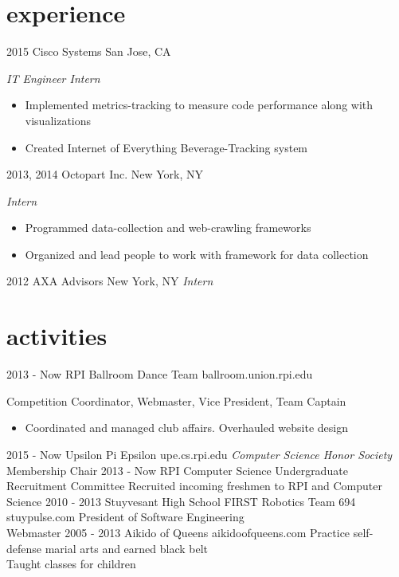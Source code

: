 \documentclass[]{friggeri-cv}
\begin{document}
\section{experience}

\begin{entrylist}
  \entry
    {2015}
    {Cisco Systems}
    {San Jose, CA}
    {\emph{IT Engineer Intern}
    \begin{itemize}
        \item Implemented metrics-tracking to measure code performance along with visualizations
        \item Created Internet of Everything Beverage-Tracking system
    \end{itemize}
    }
  \entry
    {2013, 2014}
    {Octopart Inc.}
    {New York, NY}
    {\emph{Intern}
    \begin{itemize}
        \item Programmed data-collection and web-crawling frameworks
        \item Organized and lead people to work with framework for data collection
    \end{itemize}
    }
  \entry
    {2012}
    {AXA Advisors}
    {New York, NY}
    {\emph{Intern}}
\end{entrylist}

\section{activities}

\begin{entrylist}
  \entry
    {2013 - Now}
    {RPI Ballroom Dance Team}
    {ballroom.union.rpi.edu}
    {Competition Coordinator, Webmaster, Vice President, Team Captain
    \begin{itemize}
        \item Coordinated and managed club affairs. Overhauled website design
    \end{itemize}
    }
  \entry
    {2015 - Now}
    {Upsilon Pi Epsilon}
    {upe.cs.rpi.edu}
    {\emph{Computer Science Honor Society}\\
    Membership Chair}
  \entry
    {2013 - Now}
    {RPI Computer Science Undergraduate Recruitment Committee}
    {}
    {Recruited incoming freshmen to RPI and Computer Science}
  \entry
    {2010 - 2013}
    {Stuyvesant High School FIRST Robotics Team 694}
    {stuypulse.com}
    {President of Software Engineering\\
    Webmaster}
  \entry
    {2005 - 2013}
    {Aikido of Queens}
    {aikidoofqueens.com}
    {Practice self-defense marial arts and earned black belt\\
    Taught classes for children}
\end{entrylist}
\end{document}
